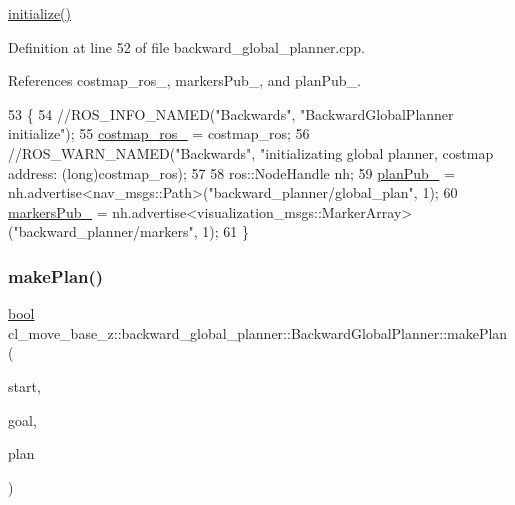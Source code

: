 \hyperlink{classcl__move__base__z_1_1backward__global__planner_1_1BackwardGlobalPlanner_af17978c77ec96d4ecc26b3a6ba75e1e9}{initialize()} 

Definition at line 52 of file backward\+\_\+global\+\_\+planner.\+cpp.



References costmap\+\_\+ros\+\_\+, markers\+Pub\+\_\+, and plan\+Pub\+\_\+.


\begin{DoxyCode}
53 \{
54     \textcolor{comment}{//ROS\_INFO\_NAMED("Backwards", "BackwardGlobalPlanner initialize");}
55     \hyperlink{classcl__move__base__z_1_1backward__global__planner_1_1BackwardGlobalPlanner_a7103c15e6540a514acd421c3c6e194a4}{costmap\_ros\_} = costmap\_ros;
56     \textcolor{comment}{//ROS\_WARN\_NAMED("Backwards", "initializating global planner, costmap address: %
       (long)costmap\_ros);}
57 
58     ros::NodeHandle nh;
59     \hyperlink{classcl__move__base__z_1_1backward__global__planner_1_1BackwardGlobalPlanner_a561eab039140948c52ec928c191f3f43}{planPub\_} = nh.advertise<nav\_msgs::Path>(\textcolor{stringliteral}{"backward\_planner/global\_plan"}, 1);
60     \hyperlink{classcl__move__base__z_1_1backward__global__planner_1_1BackwardGlobalPlanner_a6f80f7041c8cdc93e1f3dfd0e723654a}{markersPub\_} = nh.advertise<visualization\_msgs::MarkerArray>(\textcolor{stringliteral}{"backward\_planner/markers"}, 1);
61 \}
\end{DoxyCode}
\mbox{\label{classcl__move__base__z_1_1backward__global__planner_1_1BackwardGlobalPlanner_a3f1f3c81e7c52c9305544fd793741a41}} 
\subsubsection{\texorpdfstring{make\+Plan()}{makePlan()}\hspace{0.1cm}{\footnotesize\ttfamily [1/2]}}
{\footnotesize\ttfamily \hyperlink{classbool}{bool} cl\+\_\+move\+\_\+base\+\_\+z\+::backward\+\_\+global\+\_\+planner\+::\+Backward\+Global\+Planner\+::make\+Plan (\begin{DoxyParamCaption}\item[{const geometry\+\_\+msgs\+::\+Pose\+Stamped \&}]{start,  }\item[{const geometry\+\_\+msgs\+::\+Pose\+Stamped \&}]{goal,  }\item[{std\+::vector$<$ geometry\+\_\+msgs\+::\+Pose\+Stamped $>$ \&}]{plan }\end{DoxyParamCaption})}

